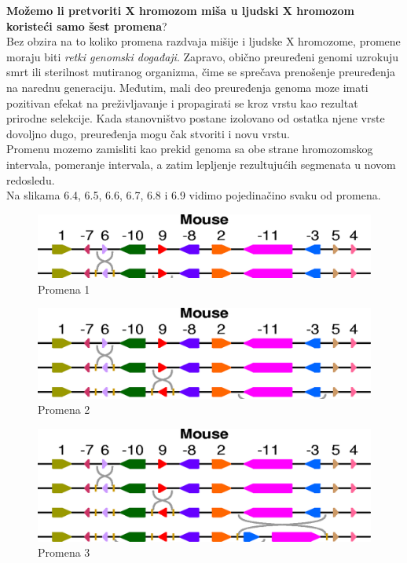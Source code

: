 \noindent \textbf{Možemo  li pretvoriti X hromozom miša u ljudski X hromozom koristeći samo šest promena}?\\

Bez obzira na to koliko promena razdvaja mišije i ljudske X hromozome, promene moraju biti \textit{retki genomski događaji}. Zapravo, obično preuređeni genomi uzrokuju smrt ili sterilnost mutiranog organizma, čime se sprečava prenošenje preuređenja na narednu generaciju. Međutim, mali deo preuređenja genoma moze imati pozitivan efekat na preživljavanje i propagirati se kroz vrstu kao rezultat prirodne selekcije. Kada stanovništvo postane izolovano od ostatka njene vrste dovoljno dugo, preuređenja mogu čak stvoriti i novu vrstu.\\

Promenu mozemo zamisliti kao prekid genoma sa obe strane hromozomskog intervala, pomeranje intervala, a zatim lepljenje rezultujućih segmenata u novom redosledu.\\

Na slikama 6.4, 6.5, 6.6, 6.7, 6.8 i 6.9 vidimo pojedinačino svaku od promena.

\begin{figure}[h!]
\centering
\includegraphics[scale=0.32]{poglavlja/6/slike/niz1.png}
\caption{Promena 1}
\label{slika:X}
\end{figure}

\begin{figure}[h!]
\centering
\includegraphics[scale=0.32]{poglavlja/6/slike/niz2.png}
\caption{Promena 2}
\label{slika:X}
\end{figure}

\begin{figure}[h!]
\centering
\includegraphics[scale=0.32]{poglavlja/6/slike/niz3.png}
\caption{Promena 3}
\label{slika:X}
\end{figure}


